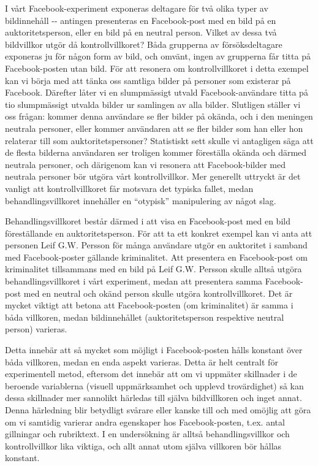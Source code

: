\documentclass[
]{book}
\begin{document}
I vårt Facebook-experiment exponeras deltagare för två olika typer av bildinnehåll -\/- antingen presenteras en Facebook-post med en bild på en auktoritetsperson, eller en bild på en neutral person. Vilket av dessa två bildvillkor utgör då kontrollvillkoret? Båda grupperna av försöksdeltagare exponeras ju för någon form av bild, och omvänt, ingen av grupperna får titta på Facebook-posten utan bild. För att resonera om kontrollvillkoret i detta exempel kan vi börja med att tänka oss samtliga bilder på personer som existerar på Facebook. Därefter låter vi en slumpmässigt utvald Facebook-användare titta på tio slumpmässigt utvalda bilder ur samlingen av alla bilder. Slutligen ställer vi oss frågan: kommer denna användare se fler bilder på okända, och i den meningen neutrala personer, eller kommer användaren att se fler bilder som han eller hon relaterar till som auktoritetspersoner? Statistiskt sett skulle vi antagligen säga att de flesta bilderna användaren ser troligen kommer föreställa okända och därmed neutrala personer, och därigenom kan vi resonera att Facebook-bilder med neutrala personer bör utgöra vårt kontrollvillkor. Mer generellt uttryckt är det vanligt att kontrollvillkoret får motsvara det typiska fallet, medan behandlingsvillkoret innehåller en ``otypisk'' manipulering av något slag.

Behandlingsvillkoret består därmed i att visa en Facebook-post med en bild föreställande en auktoritetsperson. För att ta ett konkret exempel kan vi anta att personen Leif G.W. Persson för många användare utgör en auktoritet i samband med Facebook-poster gällande kriminalitet. Att presentera en Facebook-post om kriminalitet tillsammans med en bild på Leif G.W. Persson skulle alltså utgöra behandlingsvillkoret i vårt experiment, medan att presentera samma Facebook-post med en neutral och okänd person skulle utgöra kontrollvillkoret. Det är mycket viktigt att betona att Facebook-posten (om kriminalitet) är samma i båda villkoren, medan bildinnehållet (auktoritetsperson respektive neutral person) varieras.

Detta innebär att så mycket som möjligt i Facebook-posten hålls konstant över båda villkoren, medan en enda aspekt varieras. Detta är helt centralt för experimentell metod, eftersom det innebär att om vi uppmäter skillnader i de beroende variablerna (visuell uppmärksamhet och upplevd trovärdighet) så kan dessa skillnader mer sannolikt härledas till själva bildvillkoren och inget annat. Denna härledning blir betydligt svårare eller kanske till och med omöjlig att göra om vi samtidig varierar andra egenskaper hos Facebook-posten, t.ex. antal gillningar och rubriktext. I en undersökning är alltså behandlingsvillkor och kontrollvillkor lika viktiga, och allt annat utom själva villkoren bör hållas konstant.
\end{document}
